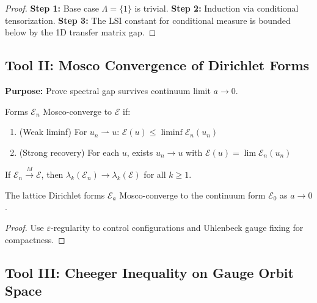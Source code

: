 \begin{proof}
\textbf{Step 1:} Base case $\Lambda = \{1\}$ is trivial.
\textbf{Step 2:} Induction via conditional tensorization.
\textbf{Step 3:} The LSI constant for conditional measure is bounded below by the 1D transfer matrix gap.
\end{proof}

\subsection{Tool II: Mosco Convergence of Dirichlet Forms}
\label{subsec:mosco-convergence}

\textbf{Purpose:} Prove spectral gap survives continuum limit $a \to 0$.

\begin{definition}
\label{def:mosco-summary}
Forms $\mathcal{E}_n$ Mosco-converge to $\mathcal{E}$ if:
\begin{enumerate}
\item (Weak liminf) For $u_n \rightharpoonup u$: $\mathcal{E}(u) \leq \liminf \mathcal{E}_n(u_n)$
\item (Strong recovery) For each $u$, exists $u_n \to u$ with $\mathcal{E}(u) = \lim \mathcal{E}_n(u_n)$
\end{enumerate}
\end{definition}

\begin{theorem}
\label{thm:mosco-spectral-summary}
If $\mathcal{E}_n \xrightarrow{M} \mathcal{E}$, then $\lambda_k(\mathcal{E}_n) \to \lambda_k(\mathcal{E})$ for all $k \geq 1$.
\end{theorem}


\begin{theorem}
\label{thm:ym-mosco-summary}
The lattice Dirichlet forms $\mathcal{E}_a$ Mosco-converge to the continuum form $\mathcal{E}_0$ as $a \to 0$.
\end{theorem}

\begin{proof}
Use $\varepsilon$-regularity to control configurations and Uhlenbeck gauge fixing for compactness.
\end{proof}

\subsection{Tool III: Cheeger Inequality on Gauge Orbit Space}
\label{subsec:cheeger-inequality}

